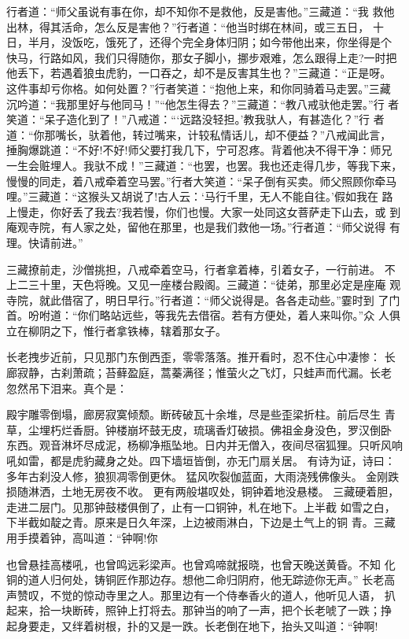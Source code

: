 行者道：“师父虽说有事在你，却不知你不是救他，反是害他。”三藏道：“我
救他出林，得其活命，怎么反是害他？”行者道：“他当时绑在林间，或三五日，
十日，半月，没饭吃，饿死了，还得个完全身体归阴；如今带他出来，你坐得是个
快马，行路如风，我们只得随你，那女子脚小，挪步艰难，怎么跟得上走?一时把
他丢下，若遇着狼虫虎豹，一口吞之，却不是反害其生也？”三藏道：“正是呀。
这件事却亏你格。如何处置？”行者笑道：“抱他上来，和你同骑着马走罢。”三藏
沉吟道：“我那里好与他同马！”“他怎生得去？”三藏道：“教八戒驮他走罢。”行
者笑道：“呆子造化到了！”八戒道：“‘远路没轻担。’教我驮人，有甚造化？”行
者道：“你那嘴长，驮着他，转过嘴来，计较私情话儿，却不便益？”八戒闻此言，
捶胸爆跳道：“不好!不好!师父要打我几下，宁可忍疼。背着他决不得干净：师兄
一生会赃埋人。我驮不成！”三藏道：“也罢，也罢。我也还走得几步，等我下来，
慢慢的同走，着八戒牵着空马罢。”行者大笑道：“呆子倒有买卖。师父照顾你牵马
哩。”三藏道：“这猴头又胡说了!古人云：‘马行千里，无人不能自往。’假如我在
路上慢走，你好丢了我去?我若慢，你们也慢。大家一处同这女菩萨走下山去，或
到庵观寺院，有人家之处，留他在那里，也是我们救他一场。”行者道：“师父说得
有理。快请前进。”

三藏撩前走，沙僧挑担，八戒牵着空马，行者拿着棒，引着女子，一行前进。
不上二三十里，天色将晚。又见一座楼台殿阁。三藏道：“徒弟，那里必定是座庵
观寺院，就此借宿了，明日早行。”行者道：“师父说得是。各各走动些。”霎时到
了门首。吩咐道：“你们略站远些，等我先去借宿。若有方便处，着人来叫你。”众
人俱立在柳阴之下，惟行者拿铁棒，辖着那女子。

长老拽步近前，只见那门东倒西歪，零零落落。推开看时，忍不住心中凄惨：
长廊寂静，古刹萧疏；苔藓盈庭，蒿蓁满径；惟萤火之飞灯，只蛙声而代漏。长老
忽然吊下泪来。真个是：

殿宇雕零倒塌，廊房寂寞倾颓。断砖破瓦十余堆，尽是些歪梁折柱。前后尽生
青草，尘埋朽烂香厨。钟楼崩坏鼓无皮，琉璃香灯破损。佛祖金身没色，罗汉倒卧
东西。观音淋坏尽成泥，杨柳净瓶坠地。日内并无僧入，夜间尽宿狐狸。只听风响
吼如雷，都是虎豹藏身之处。四下墙垣皆倒，亦无门扇关居。
有诗为证，诗曰：
多年古刹没人修，狼狈凋零倒更休。
猛风吹裂伽蓝面，大雨浇残佛像头。
金刚跌损随淋洒，土地无房夜不收。
更有两般堪叹处，铜钟着地没悬楼。
三藏硬着胆，走进二层门。见那钟鼓楼俱倒了，止有一口铜钟，札在地下。上半截
如雪之白，下半截如靛之青。原来是日久年深，上边被雨淋白，下边是土气上的铜
青。三藏用手摸着钟，高叫道：“钟啊!你

也曾悬挂高楼吼，也曾鸣远彩梁声。也曾鸡啼就报晓，也曾天晚送黄昏。不知
化铜的道人归何处，铸铜匠作那边存。想他二命归阴府，他无踪迹你无声。”
长老高声赞叹，不觉的惊动寺里之人。那里边有一个侍奉香火的道人，他听见人语，
扒起来，拾一块断砖，照钟上打将去。那钟当的响了一声，把个长老唬了一跌；挣
起身要走，又绊着树根，扑的又是一跌。长老倒在地下，抬头又叫道：“钟啊!

